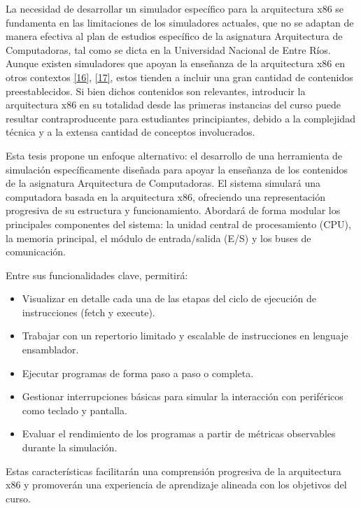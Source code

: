\documentclass[12pt,oneside]{templates/unerthesis}
\begin{document}
La necesidad de desarrollar un simulador específico para la arquitectura x86 se fundamenta en las limitaciones de los simuladores actuales, que no se adaptan de manera efectiva al plan de estudios específico de la asignatura Arquitectura de Computadoras, tal como se dicta en la Universidad Nacional de Entre Ríos. Aunque existen simuladores que apoyan la enseñanza de la arquitectura x86 en otros contextos \protect\hyperlink{ref-radivojevic_design_2011}{{[}16{]}}, \protect\hyperlink{ref-nikolic_survey_2009}{{[}17{]}}, estos tienden a incluir una gran cantidad de contenidos preestablecidos. Si bien dichos contenidos son relevantes, introducir la arquitectura x86 en su totalidad desde las primeras instancias del curso puede resultar contraproducente para estudiantes principiantes, debido a la complejidad técnica y a la extensa cantidad de conceptos involucrados.

Esta tesis propone un enfoque alternativo: el desarrollo de una herramienta de simulación específicamente diseñada para apoyar la enseñanza de los contenidos de la asignatura Arquitectura de Computadoras. El sistema simulará una computadora basada en la arquitectura x86, ofreciendo una representación progresiva de su estructura y funcionamiento. Abordará de forma modular los principales componentes del sistema: la unidad central de procesamiento (CPU), la memoria principal, el módulo de entrada/salida (E/S) y los buses de comunicación.

Entre sus funcionalidades clave, permitirá:

\begin{itemize}
\item
  Visualizar en detalle cada una de las etapas del ciclo de ejecución de instrucciones (fetch y execute).
\item
  Trabajar con un repertorio limitado y escalable de instrucciones en lenguaje ensamblador.
\item
  Ejecutar programas de forma paso a paso o completa.
\item
  Gestionar interrupciones básicas para simular la interacción con periféricos como teclado y pantalla.
\item
  Evaluar el rendimiento de los programas a partir de métricas observables durante la simulación.
\end{itemize}

Estas características facilitarán una comprensión progresiva de la arquitectura x86 y promoverán una experiencia de aprendizaje alineada con los objetivos del curso.
\end{document}

